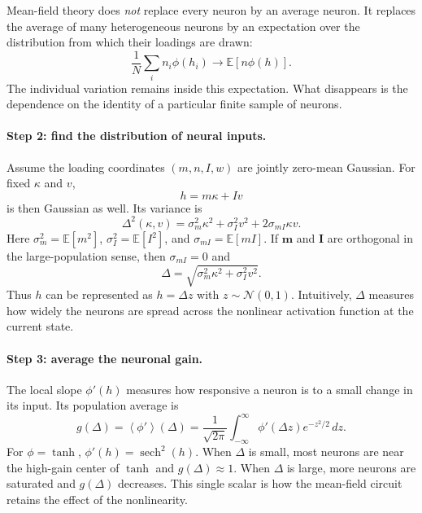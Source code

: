 \documentclass[11pt]{article}
\newcommand{\vm}{\mathbf{m}}
\newcommand{\vI}{\mathbf{I}}
\begin{document}
Mean-field theory does \emph{not} replace every neuron by an average neuron. It
replaces the average of many heterogeneous neurons by an expectation over the
distribution from which their loadings are drawn:
\[
  \frac{1}{N}\sum_i n_i\phi(h_i)
  \longrightarrow
  \mathbb{E}\!\left[n\phi(h)\right].
\]
The individual variation remains inside this expectation. What disappears is
the dependence on the identity of a particular finite sample of neurons.

\paragraph{Step 2: find the distribution of neural inputs.}
Assume the loading coordinates $(m,n,I,w)$ are jointly zero-mean Gaussian. For
fixed $\kappa$ and $v$,
\[
  h=m\kappa+Iv
\]
is then Gaussian as well. Its variance is
\begin{equation}
  \Delta^2(\kappa,v)
  =
  \sigma_m^2\kappa^2
  +
  \sigma_I^2v^2
  +
  2\sigma_{mI}\kappa v.
  \label{eq:mf_task_delta_general}
\end{equation}
Here $\sigma_m^2=\mathbb{E}[m^2]$, $\sigma_I^2=\mathbb{E}[I^2]$, and
$\sigma_{mI}=\mathbb{E}[mI]$. If $\vm$ and $\vI$ are orthogonal in the
large-population sense, then $\sigma_{mI}=0$ and
\begin{equation}
  \Delta
  =
  \sqrt{\sigma_m^2\kappa^2+\sigma_I^2v^2}.
  \label{eq:mf_task_delta_orthogonal}
\end{equation}
Thus $h$ can be represented as $h=\Delta z$ with
$z\sim\mathcal{N}(0,1)$. Intuitively, $\Delta$ measures how widely the neurons
are spread across the nonlinear activation function at the current state.

\paragraph{Step 3: average the neuronal gain.}
The local slope $\phi'(h)$ measures how responsive a neuron is to a small change
in its input. Its population average is
\begin{equation}
  g(\Delta)
  =
  \left\langle\phi'\right\rangle(\Delta)
  =
  \frac{1}{\sqrt{2\pi}}
  \int_{-\infty}^{\infty}
  \phi'(\Delta z)e^{-z^2/2}\,dz.
  \label{eq:mf_task_gain}
\end{equation}
For $\phi=\tanh$, $\phi'(h)=\operatorname{sech}^2(h)$. When $\Delta$ is small,
most neurons are near the high-gain center of $\tanh$ and $g(\Delta)\approx1$.
When $\Delta$ is large, more neurons are saturated and $g(\Delta)$ decreases.
This single scalar is how the mean-field circuit retains the effect of the
nonlinearity.
\end{document}
